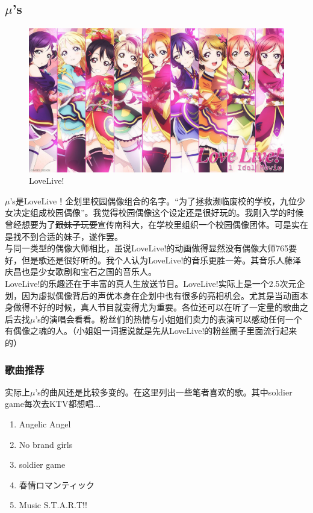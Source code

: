 \documentclass{ctexart}
\begin{document}
\subsection{$\mu$'s}
\begin{figure}[h]
\centering
 \includegraphics[width=1.0\textwidth]{lovelive.jpg}
 \caption{LoveLive!}
\end{figure}
$\mu$'s是LoveLive！企划里校园偶像组合的名字。“为了拯救濒临废校的学校，九位少女决定组成校园偶像”。我觉得校园偶像这个设定还是很好玩的。我刚入学的时候曾经想要为了\sout{跟妹子玩耍}宣传南科大，在学校里组织一个校园偶像团体。可是实在是找不到合适的妹子，遂作罢。\\
与同一类型的偶像大师相比，虽说LoveLive!的动画做得显然没有偶像大师765要好，但是歌还是很好听的。我个人认为LoveLive!的音乐更胜一筹。其音乐人藤泽庆昌也是少女歌剧和宝石之国的音乐人。\\
LoveLive!的乐趣还在于丰富的真人生放送节目。LoveLive!实际上是一个2.5次元企划，因为虚拟偶像背后的声优本身在企划中也有很多的亮相机会。尤其是当动画本身做得不好的时候，真人节目就变得尤为重要。各位还可以在听了一定量的歌曲之后去找$\mu$'s的演唱会看看。粉丝们的热情与小姐姐们卖力的表演可以感动任何一个有偶像之魂的人。（小姐姐一词据说就是先从LoveLive!的粉丝圈子里面流行起来的）
\subsubsection*{歌曲推荐}
实际上$\mu$'s的曲风还是比较多变的。在这里列出一些笔者喜欢的歌。其中soldier game每次去KTV都想唱...
\begin{enumerate}
\item Angelic Angel
\item No brand girls
\item soldier game
\item 春情ロマンティック
\item Music S.T.A.R.T!!
\end{enumerate}
\end{document}
